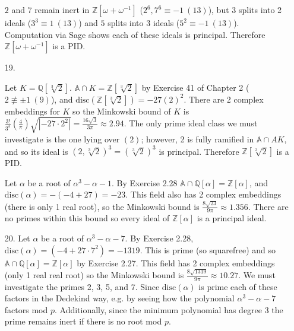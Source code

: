 \documentclass{article}
\newcommand{\w}[0]{\omega}
\newcommand{\Q}[0]{\mathbb{Q}}
\newcommand{\Z}[0]{\mathbb{Z}}
\newcommand{\disc}[1]{\text{disc}(#1)}
\newcommand{\modequiv}[3]{#1 \equiv #2\ (#3)}
\newcommand{\modnotequiv}[3]{#1 \not\equiv #2\ (#3)}
\newcommand{\ringofintegers}[1]{\mathbb{A} \cap #1}
\begin{document}
\begin{enumerate}
    $2$ and $7$ remain inert in $\Z[\w + \w^{-1}]$ ($\modequiv{2^6, 7^6}{-1}{13}$), but $3$ splits into 2 ideals ($\modequiv{3^3}{1}{13}$) and $5$ splits into 3 ideals ($\modequiv{5^2}{-1}{13}$).  Computation via Sage shows each of these ideals is principal.  Therefore $\Z[\w + \w^{-1}]$ is a PID.

    \item [19.]

    Let $K = \Q[\sqrt[3]{2}]$.  $\ringofintegers{K} = \Z[\sqrt[3]{2}]$ by Exercise 41 of Chapter 2 ($\modnotequiv{2}{\pm 1}{9}$), and $\disc{\Z[\sqrt[3]{2}]} = -27(2)^2$.  There are 2 complex embeddings for $K$ so the Minkowski bound of $K$ is $\frac{3!}{3^3}\left(\frac{4}{\pi}\right)\sqrt{|-27 \cdot 2^2|} = \frac{16\sqrt{3}}{3\pi} \approx 2.94$.  The only prime ideal class we must investigate is the one lying over $(2)$; however, 2 is fully ramified in $\ringofintegers{A}{K}$, and so its ideal is $(2, \sqrt[3]{2})^3 = (\sqrt[3]{2})^3$ is principal.  Therefore $\Z[\sqrt[3]{2}]$ is a PID.

    Let $\alpha$ be a root of $\alpha^3 - \alpha - 1$.  By Exercise 2.28 $\ringofintegers{\Q[\alpha]} = \Z[\alpha]$, and $\disc{\alpha} = -(-4 + 27) = -23$.  This field also has 2 complex embeddings (there is only 1 real root), so the Minkowski bound is $\frac{8\sqrt{23}}{9\pi} \approx 1.356$.  There are no primes within this bound so every ideal of $\Z[\alpha]$ is a principal ideal.

    \item [20.] Let $\alpha$ be a root of $\alpha^3 - \alpha - 7$.  By Exercise 2.28, $\disc{\alpha} = (-4 + 27 \cdot 7^2) = -1319$.  This is prime (so squarefree) and so $\ringofintegers{\Q[\alpha]} = \Z[\alpha]$ by Exercise 2.27.  This field has 2 complex embeddings (only 1 real real root) so the Minkowski bound is $\frac{8\sqrt{1319}}{9\pi} \approx 10.27$.  We must investigate the primes 2, 3, 5, and 7.  Since $\disc{\alpha}$ is prime each of these factors in the Dedekind way, e.g. by seeing how the polynomial $\alpha^3 - \alpha - 7$ factors mod $p$.  Additionally, since the minimum polynomial has degree 3 the prime remains inert if there is no root mod $p$.


\end{enumerate}
\end{document}

